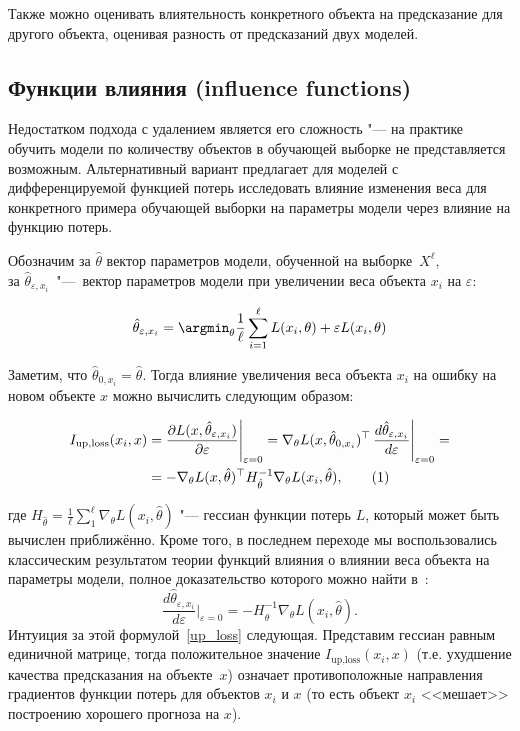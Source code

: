 \documentclass[12pt,a4paper]{article}
\begin{document}
Также можно оценивать влиятельность конкретного объекта на предсказание для другого объекта, оценивая разность от предсказаний двух моделей.

\subsection{Функции влияния (influence functions)}

Недостатком подхода с удалением является его сложность "--- на практике обучить модели по количеству объектов в обучающей выборке не представляется возможным. Альтернативный вариант предлагает для моделей с дифференцируемой функцией потерь исследовать влияние изменения веса для конкретного примера обучающей выборки на параметры модели через влияние на функцию потерь.

Обозначим за $\hat{\theta}$ вектор параметров модели, обученной на выборке~$X^\ell$, \\за $\hat{\theta}_{\varepsilon, x_i}$~"---~вектор параметров модели при увеличении веса объекта $x_i$ на $\varepsilon$:

$$
\hat{\theta}_{\varepsilon, x_i} = \argmin_{\theta} \frac{1}{\ell} \sum_{i=1}^{\ell} L(x_i, \theta) + \varepsilon L(x_i, \theta)
$$

Заметим, что $\hat{\theta}_{0, x_i} = \hat{\theta}$. Тогда влияние увеличения веса объекта $x_i$ на ошибку на новом объекте $x$ можно вычислить следующим образом:

\begin{align}
I_{\text{up}, \text{loss}} (x_i, x)
& = \frac{ \partial L(x, \hat{\theta}_{\varepsilon, x_i})}{\partial \varepsilon} \Bigg|_{\varepsilon = 0}
= \nabla_\theta L(x, \hat{\theta}_{0,x_i})^\top \, \frac{d \hat{\theta}_{\varepsilon, x_i}}{d \varepsilon} \Bigg|_{\varepsilon = 0} \notag =\\
& = - \nabla_\theta L(x, \hat{\theta})^\top H_{\hat{\theta}}^{-1} \nabla_\theta L(x_i, \hat{\theta}), \tag{1} \label{up_loss}
\end{align}

где $H_{\hat{\theta}} = \frac{1}{\ell} \sum_1^\ell \nabla_\theta L(x_i, \hat{\theta})$ "--- гессиан функции потерь $L$, который может быть вычислен приближённо. Кроме того, в последнем переходе мы воспользовались классическим результатом теории функций влияния о влиянии веса объекта на параметры модели, полное доказательство которого можно найти в~\cite{cook1982residuals}:
\[
	\frac{d \hat{\theta}_{\varepsilon, x_i}}{d \varepsilon}\Bigg|_{\varepsilon = 0} = - H_{\hat{\theta}}^{-1} \nabla_\theta L(x_i, \hat{\theta}).
\]
Интуиция за этой формулой~\ref{up_loss} следующая. Представим гессиан равным единичной матрице, тогда положительное значение $I_{\text{up}, \text{loss}} (x_i, x)$ (т.е. ухудшение качества предсказания на объекте~$x$) означает противоположные направления градиентов функции потерь для объектов $x_i$ и $x$ (то есть объект $x_i$ <<мешает>> построению хорошего прогноза на $x$).
\end{document}

